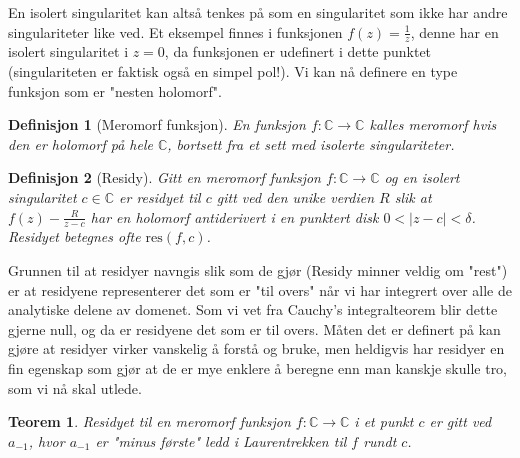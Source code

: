 \documentclass{article}
\newtheorem{theorem}{Teorem}
\newtheorem{definition}{Definisjon}
\begin{document}
En isolert singularitet kan altså tenkes på som en singularitet som ikke har andre singulariteter like ved. Et eksempel finnes i funksjonen $f(z) = \frac{1}{z}$, denne har en isolert singularitet i $z = 0$, da funksjonen er udefinert i dette punktet (singulariteten er faktisk også en simpel pol!). Vi kan nå definere en type funksjon som er "nesten holomorf".

\begin{definition}[Meromorf funksjon]
    En funksjon $f:\mathbb{C} \longrightarrow \mathbb{C}$ kalles meromorf hvis den er holomorf på hele $\mathbb{C}$, bortsett fra et sett med isolerte singulariteter. 
\end{definition}

\begin{definition}[Residy]
    Gitt en meromorf funksjon $f:\mathbb{C} \longrightarrow \mathbb{C}$ og en isolert singularitet $c \in \mathbb{C}$ er residyet til $c$ gitt ved den unike verdien $R$ slik at $f(z) - \frac{R}{z - c}$ har en holomorf antiderivert i en punktert disk $0 < |z - c| < \delta$. Residyet betegnes ofte $\mathrm{res}(f, c)$.
\end{definition}

Grunnen til at residyer navngis slik som de gjør (Residy minner veldig om "rest") er at residyene representerer det som er "til overs" når vi har integrert over alle de analytiske delene av domenet. Som vi vet fra Cauchy's integralteorem blir dette gjerne null, og da er residyene det som er til overs.
Måten det er definert på kan gjøre at residyer virker vanskelig å forstå og bruke, men heldigvis har residyer en fin egenskap som gjør at de er mye enklere å beregne enn man kanskje skulle tro, som vi nå skal utlede.

\begin{theorem}
    Residyet til en meromorf funksjon $f:\mathbb{C} \longrightarrow \mathbb{C}$ i et punkt $c$ er gitt ved $a_{-1}$, hvor $a_{-1}$ er "minus første" ledd i Laurentrekken til $f$ rundt $c$. 
\end{theorem}
\end{document}
